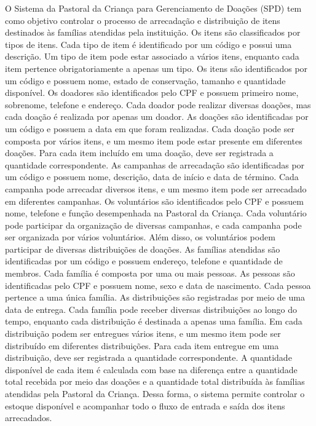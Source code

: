 ﻿\documentclass[12pt,a4paper]{article}
\begin{document}
O Sistema da Pastoral da Criança para Gerenciamento de Doações (SPD) tem como objetivo controlar o processo de arrecadação e distribuição de itens destinados às famílias atendidas pela instituição.
Os itens são classificados por tipos de itens. Cada tipo de item é identificado por um código e possui uma descrição. Um tipo de item pode estar associado a vários itens, enquanto cada item pertence obrigatoriamente a apenas um tipo. Os itens são identificados por um código e possuem nome, estado de conservação, tamanho e quantidade disponível.
Os doadores são identificados pelo CPF e possuem primeiro nome, sobrenome, telefone e endereço. Cada doador pode realizar diversas doações, mas cada doação é realizada por apenas um doador. As doações são identificadas por um código e possuem a data em que foram realizadas. Cada doação pode ser composta por vários itens, e um mesmo item pode estar presente em diferentes doações. Para cada item incluído em uma doação, deve ser registrada a quantidade correspondente.
As campanhas de arrecadação são identificadas por um código e possuem nome, descrição, data de início e data de término. Cada campanha pode arrecadar diversos itens, e um mesmo item pode ser arrecadado em diferentes campanhas.
Os voluntários são identificados pelo CPF e possuem nome, telefone e função desempenhada na Pastoral da Criança. Cada voluntário pode participar da organização de diversas campanhas, e cada campanha pode ser organizada por vários voluntários. Além disso, os voluntários podem participar de diversas distribuições de doações.
As famílias atendidas são identificadas por um código e possuem endereço, telefone e quantidade de membros. Cada família é composta por uma ou mais pessoas. As pessoas são identificadas pelo CPF e possuem nome, sexo e data de nascimento. Cada pessoa pertence a uma única família.
As distribuições são registradas por meio de uma data de entrega. Cada família pode receber diversas distribuições ao longo do tempo, enquanto cada distribuição é destinada a apenas uma família. Em cada distribuição podem ser entregues vários itens, e um mesmo item pode ser distribuído em diferentes distribuições. Para cada item entregue em uma distribuição, deve ser registrada a quantidade correspondente.
A quantidade disponível de cada item é calculada com base na diferença entre a quantidade total recebida por meio das doações e a quantidade total distribuída às famílias atendidas pela Pastoral da Criança. Dessa forma, o sistema permite controlar o estoque disponível e acompanhar todo o fluxo de entrada e saída dos itens arrecadados.
\end{document}
